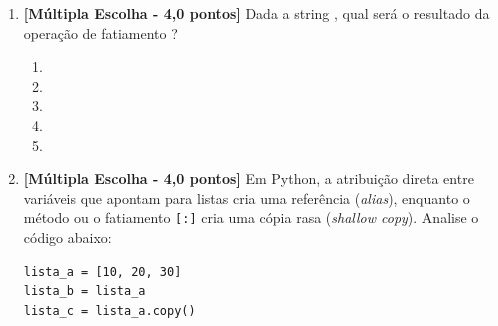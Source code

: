 \begin{enumerate}[label=\textbf{Q\arabic*.}, start=1]
\begin{enumerate}[label=\textbf{(\Alph*)}]
    \item Ocorre um erro de divisão por zero () ao tentar avaliar .
    \item O valor é , pois a primeira parte da conjunção  é , evitando a divisão por zero, e a segunda parte do  é .
    \item O valor é , pois a primeira expressão é falsa e invalida todo o teste lógico.
    \item O valor é , pois expressões com curto-circuito em Python não retornam valores booleanos puros.
    \item O programa trava em um laço infinito aguardando a definição do operador de curto-circuito.
\end{enumerate}



\vspace{0.4cm}

\item \textbf{[Múltipla Escolha - 4,0 pontos]} Dada a string , qual será o resultado da operação de fatiamento ?

\begin{enumerate}[label=\textbf{(\Alph*)}]
    \item {}
    \item {}
    \item {}
    \item {}
    \item {}
\end{enumerate}



\vspace{0.4cm}

\item \textbf{[Múltipla Escolha - 4,0 pontos]} Em Python, a atribuição direta entre variáveis que apontam para listas cria uma referência (\emph{alias}), enquanto o método  ou o fatiamento \texttt{[:]} cria uma cópia rasa (\emph{shallow copy}). Analise o código abaixo:
\begin{verbatim}
lista_a = [10, 20, 30]
lista_b = lista_a
lista_c = lista_a.copy()


\end{verbatim}
\end{enumerate}
